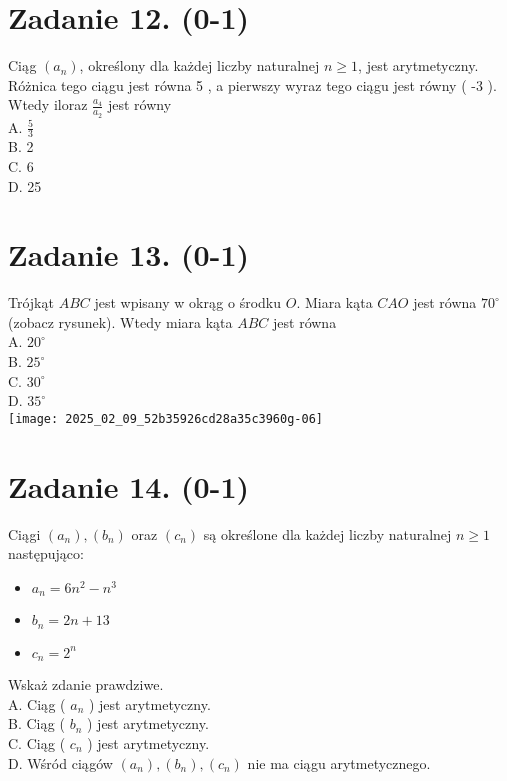 \documentclass[10pt]{article}
\begin{document}
\section*{Zadanie 12. (0-1)}
Ciąg \(\left(a_{n}\right)\), określony dla każdej liczby naturalnej \(n \geq 1\), jest arytmetyczny. Różnica tego ciągu jest równa 5 , a pierwszy wyraz tego ciągu jest równy ( -3 ). Wtedy iloraz \(\frac{a_{4}}{a_{2}}\) jest równy\\
A. \(\frac{5}{3}\)\\
B. 2\\
C. 6\\
D. 25

\section*{Zadanie 13. (0-1)}
Trójkąt \(A B C\) jest wpisany w okrąg o środku \(O\). Miara kąta \(C A O\) jest równa \(70^{\circ}\) (zobacz rysunek). Wtedy miara kąta \(A B C\) jest równa\\
A. \(20^{\circ}\)\\
B. \(25^{\circ}\)\\
C. \(30^{\circ}\)\\
D. \(35^{\circ}\)\\
\texttt{[image: 2025\_02\_09\_52b35926cd28a35c3960g-06]}

\section*{Zadanie 14. (0-1)}
Ciągi \(\left(a_{n}\right),\left(b_{n}\right)\) oraz \(\left(c_{n}\right)\) są określone dla każdej liczby naturalnej \(n \geq 1\) następująco:

\begin{itemize}
  \item \(a_{n}=6 n^{2}-n^{3}\)
  \item \(b_{n}=2 n+13\)
  \item \(c_{n}=2^{n}\)
\end{itemize}

Wskaż zdanie prawdziwe.\\
A. Ciąg ( \(a_{n}\) ) jest arytmetyczny.\\
B. Ciąg ( \(b_{n}\) ) jest arytmetyczny.\\
C. Ciąg ( \(c_{n}\) ) jest arytmetyczny.\\
D. Wśród ciągów \(\left(a_{n}\right),\left(b_{n}\right),\left(c_{n}\right)\) nie ma ciągu arytmetycznego.
\end{document}
